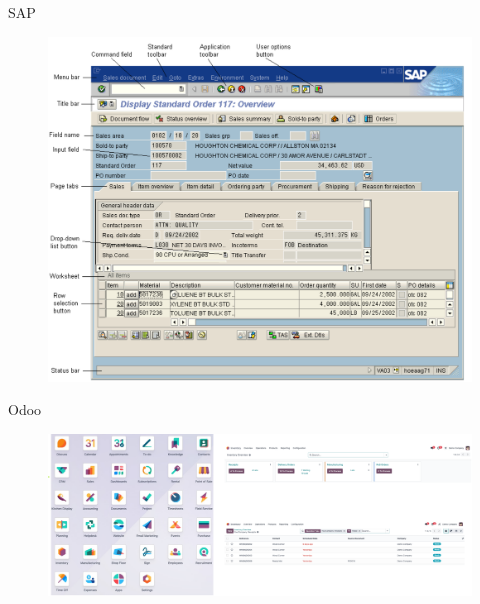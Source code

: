 \begin{frame}{SAP}
    
\begin{figure}
    \centering
    \includegraphics[width=0.50\linewidth]{assets/SAP.png}
\end{figure}

\end{frame}
\begin{frame}{Odoo}
    
\begin{figure}
    \centering
    \includegraphics[width=0.90\linewidth]{assets/OdooInterface.png}
\end{figure}

\end{frame}

